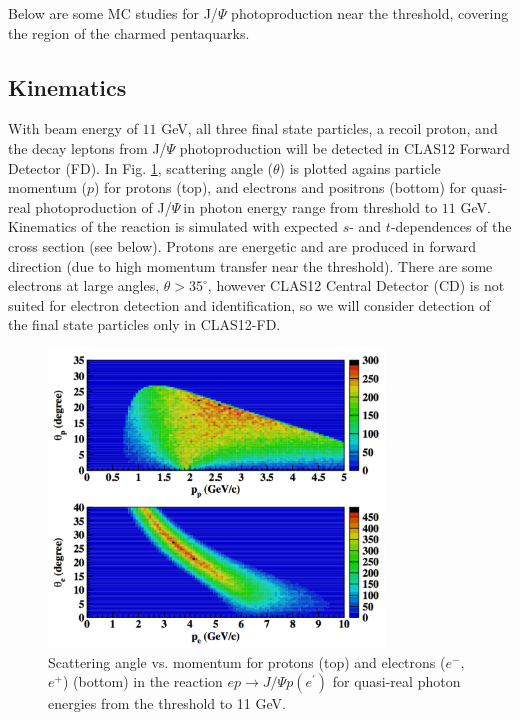\documentclass[12pt]{revtex4}
\newcommand{\JP}{J/$\Psi~$}
\begin{document}
Below are some MC studies for J/$\Psi$ photoproduction near the threshold, covering the region of the  charmed pentaquarks.

\subsection{Kinematics} 

With beam energy of $11$ GeV, all three final state particles, a recoil proton, and the decay leptons from J/$\Psi$ photoproduction will be detected in CLAS12 Forward Detector (FD). In Fig. \ref{fig:kine}, scattering angle ($\theta$) is plotted agains particle momentum ($p$) for protons (top), and electrons and positrons (bottom) for quasi-real photoproduction of \JP in photon energy range from threshold to $11$ GeV. Kinematics of the reaction is simulated with expected $s$- and $t$-dependences of the cross section (see below). Protons are energetic and are produced in forward direction (due to high momentum transfer near the threshold). There are some electrons at large angles, $\theta>35^\circ$, however CLAS12 Central Detector (CD) is not suited for electron detection and identification, so we will consider detection of the final state particles only in CLAS12-FD.  

\begin{figure}[htbp]
\begin{center}
\includegraphics[width=0.8\textwidth]{p_theta_pe.pdf}
\caption{Scattering angle vs. momentum for protons (top) and electrons ($e^-$, $e^+$) (bottom) in the reaction $e p\to J/\Psi p (e^\prime)$ for quasi-real photon energies from the threshold to 11 GeV.}
\label{fig:kine}
\end{center}
\end{figure}
\end{document}
